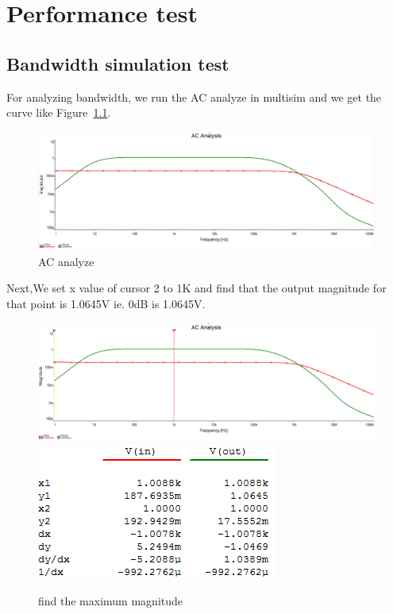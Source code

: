 \chapter{Performance test} 

\section{Bandwidth simulation test} 

For analyzing bandwidth\cite{Bandwidth}, we run the AC analyze in multisim and we get the curve like Figure~\ref{fig:AC analyse}.

\begin{figure}[htbp]
\centering
\includegraphics[scale=0.45]{"../Photo/Chap7/bandewith simulation"}
\caption{AC analyze}
\label{fig:AC analyse}
\end{figure}

Next,We set x value of cursor 2 to 1K and find that the output magnitude for that point is 1.0645V ie. 0dB is 1.0645V.

\begin{figure}[htbp]
\centering
\includegraphics[scale=0.45]{"../Photo/Chap7/1k cursor"}\\[0.5cm]
\includegraphics[scale=1]{"../Photo/Chap7/1k cursor data"}
\caption{find the maximum magnitude}
\label{fig:find the maximum magnitude}
\end{figure}

